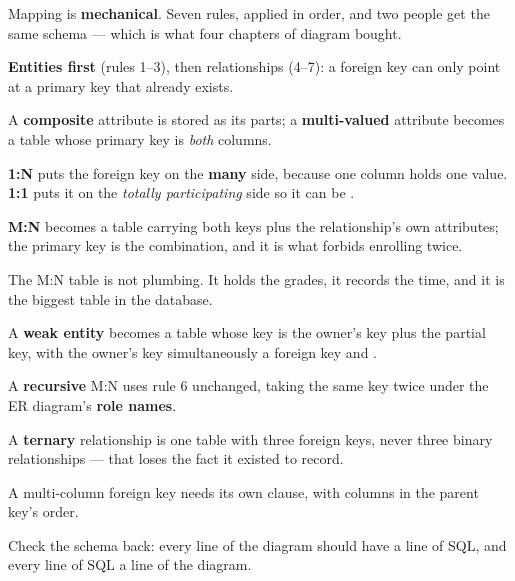 \begin{chaptersummary}
\begin{tight}
  \item Mapping is \textbf{mechanical}. Seven rules, applied in order, and two
        people get the same schema --- which is what four chapters of diagram
        bought.
  \item \textbf{Entities first} (rules 1--3), then relationships (4--7): a
        foreign key can only point at a primary key that already exists.
  \item A \textbf{composite} attribute is stored as its parts; a
        \textbf{multi-valued} attribute becomes a table whose primary key is
        \emph{both} columns.
  \item \textbf{1:N} puts the foreign key on the \textbf{many} side, because
        one column holds one value. \textbf{1:1} puts it on the \emph{totally
        participating} side so it can be .
  \item \textbf{M:N} becomes a table carrying both keys plus the
        relationship's own attributes; the primary key is the combination, and
        it is what forbids enrolling twice.
  \item The M:N table is not plumbing. It holds the grades, it records the
        time, and it is the biggest table in the database.
  \item A \textbf{weak entity} becomes a table whose key is the owner's key
        plus the partial key, with the owner's key simultaneously a foreign
        key and .
  \item A \textbf{recursive} M:N uses rule 6 unchanged, taking the same key
        twice under the ER diagram's \textbf{role names}.
  \item A \textbf{ternary} relationship is one table with three foreign keys,
        never three binary relationships --- that loses the fact it existed to
        record.
  \item A multi-column foreign key needs its own  clause,
        with columns in the parent key's order.
  \item Check the schema back: every line of the diagram should have a line of
        SQL, and every line of SQL a line of the diagram.
\end{tight}
\end{chaptersummary}

